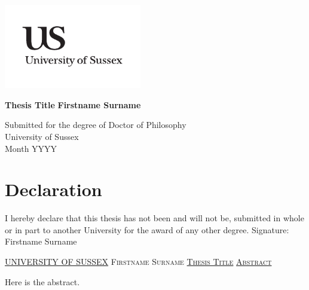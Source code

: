 \documentclass[a4paper,11pt,twoside]{report}
\newcommand{\linespacing}{1.5}
\renewcommand{\baselinestretch}{\linespacing}
\begin{document}




\thispagestyle{empty}
\begin{flushright}
\includegraphics[width=6cm]{BaseDir/Plots/uslogo.pdf}
\end{flushright}	
\vskip40mm
\begin{center}
\huge\textbf{Thesis Title}
\vskip5mm
\Large\textbf{Firstname Surname}
\normalsize
\end{center}
\vfill
\begin{flushleft}
\large
Submitted for the degree of Doctor of Philosophy \\
University of Sussex	\\
Month YYYY
\end{flushleft}		


\chapter*{Declaration}
I hereby declare that this thesis has not been and will not be, submitted in whole or in part to another University for the award of any other degree.
\vskip5mm
Signature:
\vskip15mm
Firstname Surname


\thispagestyle{empty}
\newpage
\null\vskip10mm
\begin{center}
\large
\underline{UNIVERSITY OF SUSSEX}
\vskip20mm
\textsc{Firstname Surname}
\vskip20mm
\underline{\textsc{Thesis Title}}
\vskip20mm
\underline{\textsc{Abstract}}
\vskip2mm
\end{center}
\renewcommand{\baselinestretch}{1.0}
\small\normalsize
Here is the abstract.
\end{document}
